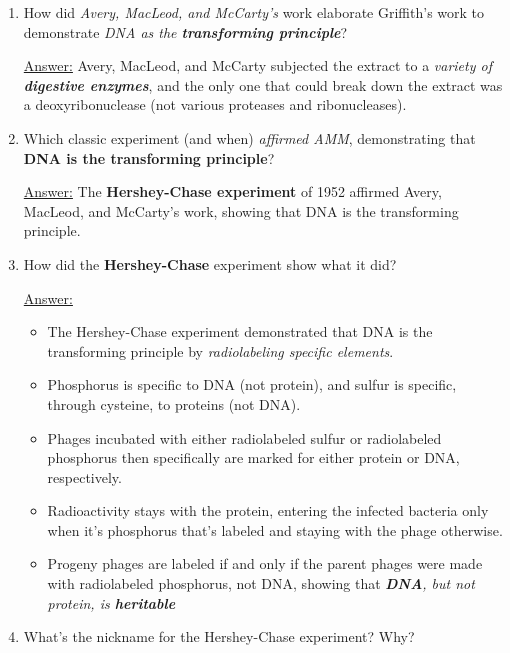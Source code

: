 \documentclass{article}
\newenvironment{QandA}{\begin{enumerate}[label=\bfseries Q\arabic*.]}
                       {\end{enumerate}}
\newenvironment{answered}{\par\normalfont\underline{Answer:}}{}
\begin{document}
\begin{QandA}
\begin{answered}
    DNA's \textit{biochemical boringness} was oft cited as reason that it couldn't encode life's complexity; \textit{protein} was the alternative.
    \end{answered}
  \item{How did \textit{Avery, MacLeod, and McCarty's} work elaborate Griffith's work to demonstrate \textit{DNA as the \textbf{transforming principle}}?}
    \begin{answered}
    Avery, MacLeod, and McCarty subjected the extract to a \textit{variety of \textbf{digestive enzymes}}, and the only one that could break down the extract was a deoxyribonuclease (not various proteases and ribonucleases).
    \end{answered}
  \item{Which classic experiment (and when) \textit{affirmed AMM}, demonstrating that \textbf{DNA is the transforming principle}?}
    \begin{answered}
    The \textbf{Hershey-Chase experiment} of 1952 affirmed Avery, MacLeod, and McCarty's work, showing that DNA is the transforming principle.
    \end{answered}
  \item{How did the \textbf{Hershey-Chase} experiment show what it did?}
    \begin{answered}
    \begin{itemize}
      \item{The Hershey-Chase experiment demonstrated that DNA is the transforming principle by \textit{radiolabeling specific elements}.}
      \item{Phosphorus is specific to DNA (not protein), and sulfur is specific, through cysteine, to proteins (not DNA).}
      \item{Phages incubated with either radiolabeled sulfur or radiolabeled phosphorus then specifically are marked for either protein or DNA, respectively.}
      \item{Radioactivity stays with the protein, entering the infected bacteria only when it's phosphorus that's labeled and staying with the phage otherwise.}
      \item{Progeny phages are labeled if and only if the parent phages were made with radiolabeled phosphorus, not DNA, showing that \textit{\textbf{DNA}, but not protein, is \textbf{heritable}}}
    \end{itemize}
    \end{answered}
  \item{What's the nickname for the Hershey-Chase experiment? Why?}

\end{QandA}
\end{document}
